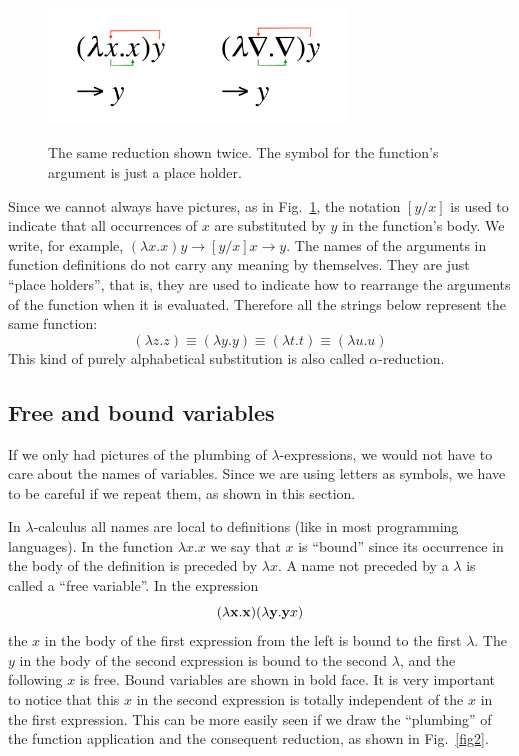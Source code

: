 \documentclass[12pt]{article}
\begin{document}
\begin{figure}[htb]
\centerline{\includegraphics[width=4cm]{lam1}\includegraphics[width=4cm]{lam2}}
\caption{The same reduction shown twice. The symbol for the function's argument is just a place holder.\label{fig1}}
\end{figure} 

Since we cannot always have pictures, as in Fig.~\ref{fig1}, the notation $[y/x]$ is used to indicate that all occurrences of $x$ are substituted by $y$ in the function's body. We write, for example, $(\lambda x.x)y \rightarrow [y/x]x \rightarrow y$. The names of the arguments in function definitions do not carry any meaning by themselves. They are just ``place holders'', that is, they are used to indicate how to rearrange the arguments of the function when it is evaluated. Therefore all the strings below represent the same function:
$$(\lambda z.z) \equiv (\lambda y.y)\equiv (\lambda t.t)\equiv (\lambda u.u)
$$
This kind of purely alphabetical substitution is also called $\alpha$-reduction.

\subsection{Free and bound variables}

If we only had pictures of the plumbing of $\lambda$-expressions, we would not have to care about the names of variables. Since we are using letters as symbols, we have to be careful if we repeat them, as shown in this section.

In $\lambda$-calculus all names are local to definitions (like in most programming languages). In the function $\lambda x.x$ we say that $x$ is ``bound'' since its occurrence in the body of the definition is preceded by $\lambda x$. A name not preceded by a $\lambda$ is called a ``free variable''. In the expression 
$$(\lambda {\bf x}.{\bf x})(\lambda{\bf y}.{\bf y}x)$$ 
the $x$ in the body of the first expression from the left is bound to the first $\lambda$. The $y$ in the body of the second expression is bound to the second $\lambda$, and the following $x$ is free. Bound variables are shown in bold face.  It is very important to notice that this $x$ in the second expression is totally independent of the $x$ in the first expression. This can be more easily seen if we draw the ``plumbing'' of the function application and the consequent reduction, as shown in Fig.~\ref{fig2}.
\end{document}
